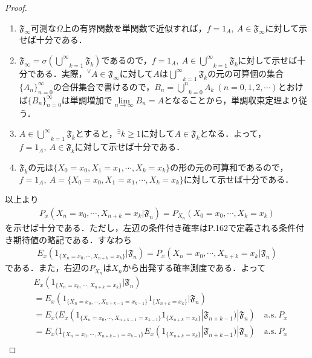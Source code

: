 \documentclass[dvipdfmx]{jsarticle}
\newtheorem{proof}{証明}
\begin{document}
\begin{proof}
\begin{enumerate}
\renewcommand{\labelenumi}{(\arabic{enumi})}
\item $\mathfrak{F}_\infty$可測な$\Omega$上の有界関数を単関数で近似すれば，$f=1_A,{\ }A\in\mathfrak{F}_\infty$に対して示せば十分である．
\item $\mathfrak{F}_{\infty}=\sigma\left(\underset{k=1}{\overset{\infty}{\bigcup}}\mathfrak{F}_k\right)$であるので，$f=1_A,{\ }A\in\underset{k=1}{\overset{\infty}{\bigcup}}\mathfrak{F}_k$に対して示せば十分である．実際，$^\forall A\in\mathfrak{F}_{\infty}$に対して$A$は$\underset{k=1}{\overset{\infty}{\bigcup}}\mathfrak{F}_k$の元の可算個の集合$\{A_n\}_{n=0}^\infty$の合併集合で書けるので，$B_n=\underset{k=0}{\overset{n}{\bigcup}}A_k{\ }(n=0,1,2,\cdots)$とおけば$\{B_n\}_{n=0}^\infty$は単調増加で$\underset{n\to\infty}{\lim}B_n=A$となることから，単調収束定理より従う．
\item $A\in\underset{k=1}{\overset{\infty}{\bigcup}}\mathfrak{F}_k$とすると，$^\exists k\geq 1$に対して$A\in \mathfrak{F}_k$となる．よって，$f=1_A,{\ }A\in\mathfrak{F}_k$に対して示せば十分である．
\item $\mathfrak{F}_k$の元は$\{X_0=x_0,X_1=x_1,\cdots,X_k=x_k\}$の形の元の可算和であるので，$f=1_A,{\ }A=\{X_0=x_0,X_1=x_1,\cdots,X_k=x_k\}$に対して示せば十分である．
\end{enumerate}
以上より
\begin{align*}
P_x(X_n=x_0,\cdots,X_{n+k}=x_k|\mathfrak{F}_n)=P_{X_n}(X_0=x_0,\cdots,X_k=x_k)
\end{align*}
を示せば十分である．ただし，左辺の条件付き確率は\cite{kotani}P.162で定義される条件付き期待値の略記である．すなわち
\begin{align*}
E_x(1_{\{X_n=x_0,\cdots,X_{n+k}=x_k\}}|\mathfrak{F}_n)=P_x(X_n=x_0,\cdots,X_{n+k}=x_k|\mathfrak{F}_n)
\end{align*}
である．また，右辺の$P_{X_n}$は$X_n$から出発する確率測度である．よって
\begin{align*}
&E_x(1_{\{X_n=x_0,\cdots,X_{n+k}=x_k\}}|\mathfrak{F}_n) \\
&=E_x(1_{\{X_n=x_0,\cdots,X_{n+k-1}=x_{k-1}\}}1_{\{X_{n+k}=x_k\}}|\mathfrak{F}_n) \\
&=E_x(E_x(1_{\{X_n=x_0,\cdots,X_{n+k-1}=x_{k-1}\}}1_{\{X_{n+k}=x_k\}}|\mathfrak{F}_{n+k-1})|\mathfrak{F}_n) \quad \mathrm{a.s.}{\ }P_x \\
&=E_x(1_{\{X_n=x_0,\cdots,X_{n+k-1}=x_{k-1}\}}E_x(1_{\{X_{n+k}=x_k\}}|\mathfrak{F}_{n+k-1})|\mathfrak{F}_n) \quad \mathrm{a.s.}{\ }P_x \\

\end{align*}
\end{proof}
\end{document}
